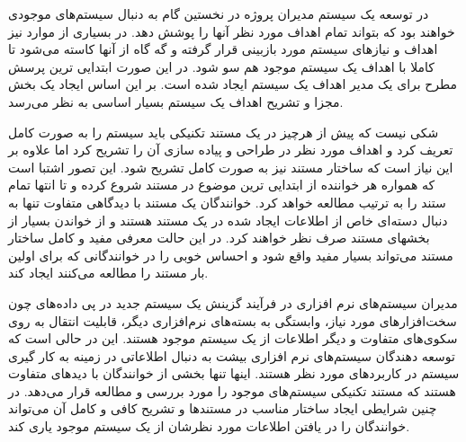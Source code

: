  در توسعه یک سیستم مدیران پروژه در نخستین گام به دنبال سیستم‌های موجودی خواهند
  بود که بتواند تمام اهداف مورد نظر آنها را پوشش دهد. در بسیاری از موارد نیز
  اهداف و نیازهای سیستم مورد بازبینی قرار گرفته و گه گاه از آنها کاسته می‌شود تا
  کاملا با اهداف یک سیستم موجود هم سو شود. در این صورت ابتدایی ترین پرسش مطرح
  برای یک مدیر اهداف یک سیستم ایجاد شده است. بر این اساس ایجاد یک بخش مجزا و
  تشریح اهداف یک سیستم بسیار اساسی به نظر می‌رسد.

  شکی نیست که پیش از هرچیز در یک مستند تکنیکی باید سیستم را به صورت کامل تعریف
  کرد و اهداف مورد نظر در طراحی و پیاده سازی آن را تشریح کرد اما علاوه بر این
  نیاز است که ساختار مستند نیز به صورت کامل تشریح شود. این تصور اشتبا است که
  همواره هر خواننده از ابتدایی ترین موضوع در مستند شروع کرده و تا انتها تمام
  ستند را به ترتیب مطالعه خواهد کرد.
  خوانندگان یک مستند با دیدگاهی متفاوت تنها به دنبال دسته‌ای خاص از اطلاعات
  ایجاد شده در یک مستند هستند و از خواندن بسیار از بخشهای مستند صرف نظر خواهند
  کرد. در این حالت معرفی مفید و کامل ساختار مستند می‌تواند بسیار مفید واقع شود و
  احساس خوبی را در خوانندگانی که برای اولین بار مستند را مطالعه می‌کنند ایجاد
  کند.

  مدیران  سیستم‌های نرم افزاری در فرآیند گزینش یک سیستم جدید در پی داده‌های چون
  سخت‌افزارهای مورد نیاز، وابستگی به بسته‌های نرم‌افزاری دیگر، قابلیت انتقال به
  روی سکوی‌های متفاوت و دیگر اطلاعات از یک سیستم موجود هستند. این در حالی است که
  توسعه دهندگان سیستم‌های نرم افزاری بیشت به دنبال اطلاعاتی در زمینه به کار گیری
  سیستم در کاربردهای مورد نظر هستند. اینها تنها بخشی از خوانندگان با دیدهای
  متفاوت هستند که مستند تکنیکی سیستم‌های موجود را مورد بررسی و مطالعه قرار
  می‌دهد. در چنین شرایطی ایجاد ساختار مناسب در مستندها و تشریح کافی و کامل آن
  می‌تواند خوانندگان را در یافتن اطلاعات مورد نظرشان از یک سیستم موجود یاری کند.

